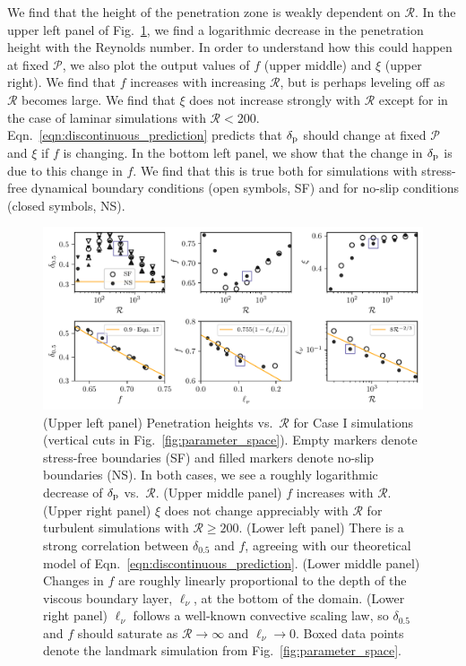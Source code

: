 \documentclass[twocolumn, linenumbers]{aastex631}
\newcommand{\delp}{\ensuremath{\delta_{\rm{p}}}}
\newcommand{\mP}{\ensuremath{\mathcal{P}}}
\newcommand{\mR}{\ensuremath{\mathcal{R}}}
\begin{document}
We find that the height of the penetration zone is weakly dependent on $\mR$.
In the upper left panel of Fig.~\ref{fig:parameters_vs_re}, we find a logarithmic decrease in the penetration height with the Reynolds number.
In order to understand how this could happen at fixed $\mP$, we also plot the output values of $f$ (upper middle) and $\xi$ (upper right).
We find that $f$ increases with increasing $\mR$, but is perhaps leveling off as $\mR$ becomes large.
We find that $\xi$ does not increase strongly with $\mR$ except for in the case of laminar simulations with $\mR < 200$.
Eqn.~\ref{eqn:discontinuous_prediction} predicts that $\delp$ should change at fixed $\mP$ and $\xi$ if $f$ is changing.
In the bottom left panel, we show that the change in $\delp$ is due to this change in $f$.
We find that this is true both for simulations with stress-free dynamical boundary conditions (open symbols, SF) and for no-slip conditions (closed symbols, NS).

\begin{figure}[t]
\centering
\includegraphics[width=\textwidth]{parameters_vs_re.pdf}
\caption{
(Upper left panel) Penetration heights vs.~$\mR$ for Case I simulations (vertical cuts in Fig.~\ref{fig:parameter_space}).
Empty markers denote stress-free boundaries (SF) and filled markers denote no-slip boundaries (NS).
In both cases, we see a roughly logarithmic decrease of $\delp$ vs.~$\mR$.
(Upper middle panel) $f$ increases with $\mR$.
(Upper right panel) $\xi$ does not change appreciably with $\mR$ for turbulent simulations with $\mR \geq 200$.
(Lower left panel) There is a strong correlation between $\delta_{0.5}$ and $f$, agreeing with our theoretical model of Eqn.~\ref{eqn:discontinuous_prediction}.
(Lower middle panel) Changes in $f$ are roughly linearly proportional to the depth of the viscous boundary layer, $\ell_\nu$, at the bottom of the domain.
(Lower right panel) $\ell_\nu$ follows a well-known convective scaling law, so $\delta_{0.5}$ and $f$ should saturate as $\mR \rightarrow \infty$ and $\ell_{\nu} \rightarrow 0$.
Boxed data points denote the landmark simulation from Fig.~\ref{fig:parameter_space}.
\label{fig:parameters_vs_re}
}
\end{figure}
\end{document}
